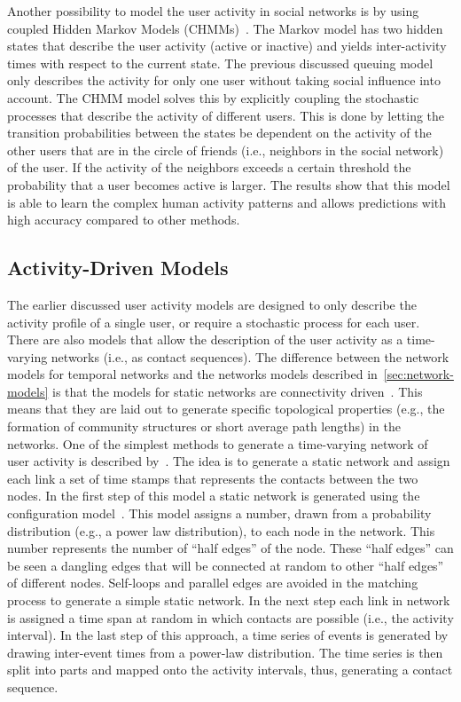 Another possibility to model the user activity in social networks is by using coupled Hidden Markov Models (CHMMs)~\cite{Raghavan2013}.
The Markov model has two hidden states that describe the user activity (active or inactive) and yields inter-activity times with respect to the current state.
The previous discussed queuing model only describes the activity for only one user without taking social influence into account.
   The CHMM model solves this by explicitly coupling the stochastic processes that describe the activity of different users.
   This is done by letting the transition probabilities between the states be dependent on the activity of the other users that are in the circle of friends (i.e., neighbors in the social network) of the user.
If the activity of the neighbors exceeds a certain threshold the probability that a user becomes active is larger.
The results show that this model is able to learn the complex human activity patterns and allows predictions with high accuracy compared to other methods.


\subsection{Activity-Driven Models}

The earlier discussed user activity models are designed to only describe the activity profile of a single user, or require a stochastic process for each user.
There are also models that allow the description of the user activity as a time-varying networks (i.e., as contact sequences).
The difference between the network models for temporal networks and the networks models described in~\autoref{sec:network-models} is that the models for static networks are connectivity driven~\cite{Perra2012}.
This means that they are laid out to generate specific topological properties (e.g., the formation of community structures or short average path lengths) in the networks.
One of the simplest methods to generate a time-varying network of user activity is described by~\citet{Holme2013}.
The idea is to generate a static network and assign each link a set of time stamps that represents the contacts between the two nodes.
In the first step of this model a static network is generated using the configuration model~\cite[cf. sec. 13.2]{Newman2010}.
This model assigns a number, drawn from a probability distribution (e.g., a power law distribution), to each node in the network.
This number represents the number of \enquote{half edges} of the node.
These \enquote{half edges} can be seen a dangling edges that will be connected at random to other \enquote{half edges} of different nodes.
Self-loops and parallel edges are avoided in the matching process to generate a simple static network.
In the next step each link in network is assigned a time span at random in which contacts are possible (i.e., the activity interval).
In the last step of this approach, a time series of events is generated by drawing inter-event times from a power-law distribution.
The time series is then split into parts and mapped onto the activity intervals, thus, generating a contact sequence.
